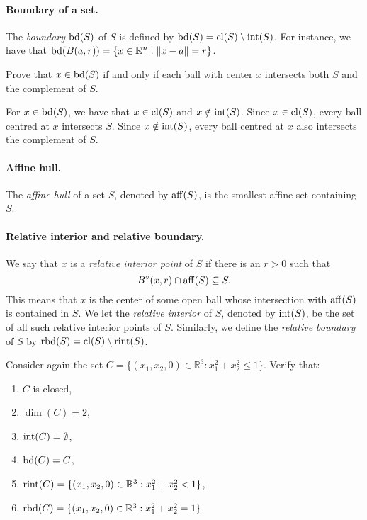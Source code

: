 \paragraph{Boundary of a set.}
The \emph{boundary} $\operatorname*{bd}(S)$ of $S$ is defined by $\operatorname*{bd}(S) = \operatorname*{cl}(S) \setminus \operatorname*{int}(S)$.
For instance, we have that $\operatorname*{bd}(B(a, r)) = \{ x \in \mathbb{R}^n : \lVert x - a\rVert = r \}$.

\begin{exercise}
  Prove that $x \in \operatorname*{bd}(S)$ if and only if each ball with center $x$ intersects both $S$ and the complement of $S$.
\end{exercise}

\begin{solution}
  For $x \in \operatorname*{bd}(S)$, we have that $x \in \operatorname*{cl}(S)$ and $x \notin \operatorname*{int}(S)$.
  Since $x \in \operatorname*{cl}(S)$, every ball centred at $x$ intersects $S$.
  Since $x \notin \operatorname*{int}(S)$, every ball centred at $x$ also intersects the complement of $S$.
\end{solution}

\paragraph{Affine hull.}
The \emph{affine hull} of a set $S$, denoted by $\operatorname*{aff}(S)$, is the smallest affine set containing $S$.

\paragraph{Relative interior and relative boundary.}
We say that $x$ is a \emph{relative interior point} of $S$ if there is an $r > 0$ such that
\begin{equation}
  B^\circ(x, r) \cap \operatorname*{aff}(S) \subseteq S.
\end{equation}
This means that $x$ is the center of some open ball whose intersection with $\operatorname*{aff}(S)$ is contained in $S$.
We let the \emph{relative interior} of $S$, denoted by $\operatorname*{int}(S)$, be the set of all such relative interior points of $S$.
Similarly, we define the \emph{relative boundary} of $S$ by $\operatorname*{rbd}(S) = \operatorname*{cl}(S) \setminus \operatorname*{rint}(S)$.

\begin{exercise}
  Consider again the set $C = \{ (x_1, x_2, 0) \in \mathbb{R}^3 : x_1^2 + x_2^2 \leq 1 \}$.
  Verify that:
  \begin{enumerate}[label = (\emph{\roman*})]
    \item $C$ is closed,
    \item $\dim(C) = 2$,
    \item $\operatorname*{int}(C) = \emptyset$,
    \item $\operatorname*{bd}(C) = C$,
    \item $\operatorname*{rint}(C) = \{ (x_1, x_2, 0) \in \mathbb{R}^3 : x_1^2 + x_2^2 < 1 \}$,
    \item $\operatorname*{rbd}(C) = \{ (x_1, x_2, 0) \in \mathbb{R}^3 : x_1^2 + x_2^2 = 1 \}$.
  \end{enumerate}
\end{exercise}

